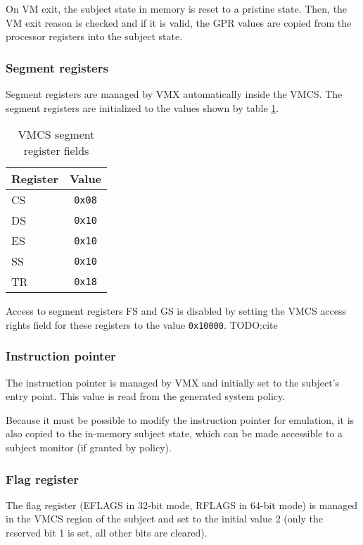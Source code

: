 On VM exit, the subject state in memory is reset to a pristine state. Then, the
VM exit reason is checked and if it is valid, the GPR values are copied from the
processor registers into the subject state.

\subsubsection{Segment registers}
Segment registers are managed by VMX automatically inside the VMCS. The segment
registers are initialized to the values shown by table
\ref{tab:vmcs-segment-regs}.

\begin{table}[h]
	\centering
	\begin{tabular}{l|c}
		\textbf{Register} & \textbf{Value} \\
		\hline
		CS & \texttt{0x08} \\
		DS & \texttt{0x10} \\
		ES & \texttt{0x10} \\
		SS & \texttt{0x10} \\
		TR & \texttt{0x18} \\
		\hline
	\end{tabular}
	\caption{VMCS segment register fields}
	\label{tab:vmcs-segment-regs}
\end{table}

Access to segment registers FS and GS is disabled by setting the VMCS access
rights field for these registers to the value \texttt{0x10000}.
TODO:cite

\subsubsection{Instruction pointer}
The instruction pointer is managed by VMX and initially set to the subject's
entry point. This value is read from the generated system policy.

Because it must be possible to modify the instruction pointer for emulation, it
is also copied to the in-memory subject state, which can be made accessible to a
subject monitor (if granted by policy).

\subsubsection{Flag register}
The flag register (EFLAGS in 32-bit mode, RFLAGS in 64-bit mode) is managed in
the VMCS region of the subject and set to the initial value 2 (only the reserved
bit 1 is set, all other bits are cleared).

